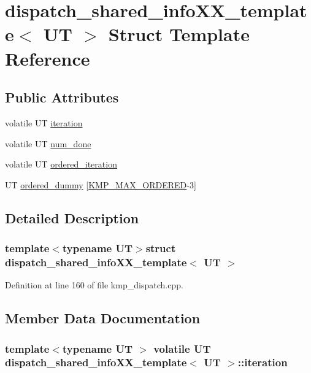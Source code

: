 \hypertarget{structdispatch__shared__infoXX__template}{\section{dispatch\-\_\-shared\-\_\-info\-X\-X\-\_\-template$<$ U\-T $>$ Struct Template Reference}
\label{structdispatch__shared__infoXX__template}
}
\subsection*{Public Attributes}
\begin{DoxyCompactItemize}
\item 
volatile U\-T \hyperlink{structdispatch__shared__infoXX__template_addd0415a887dac56b1103fa708cec5ca}{iteration}
\item 
volatile U\-T \hyperlink{structdispatch__shared__infoXX__template_ac7d0f74c4a438b516a94455a55c9949a}{num\-\_\-done}
\item 
volatile U\-T \hyperlink{structdispatch__shared__infoXX__template_a34f55d961278aab230430ecf230ab92e}{ordered\-\_\-iteration}
\item 
U\-T \hyperlink{structdispatch__shared__infoXX__template_a90650146228be5fcac95c7dabaaa7fcc}{ordered\-\_\-dummy} \mbox{[}\hyperlink{kmp_8h_ab5cc9eb736cfbc3fe74fc2324c0b19be}{K\-M\-P\-\_\-\-M\-A\-X\-\_\-\-O\-R\-D\-E\-R\-E\-D}-\/3\mbox{]}
\end{DoxyCompactItemize}


\subsection{Detailed Description}
\subsubsection*{template$<$typename U\-T$>$struct dispatch\-\_\-shared\-\_\-info\-X\-X\-\_\-template$<$ U\-T $>$}



Definition at line 160 of file kmp\-\_\-dispatch.\-cpp.



\subsection{Member Data Documentation}
\hypertarget{structdispatch__shared__infoXX__template_addd0415a887dac56b1103fa708cec5ca}{
\subsubsection[{iteration}]{\setlength{\rightskip}{0pt plus 5cm}template$<$typename U\-T $>$ volatile U\-T {\bf dispatch\-\_\-shared\-\_\-info\-X\-X\-\_\-template}$<$ U\-T $>$\-::iteration}}\label{structdispatch__shared__infoXX__template_addd0415a887dac56b1103fa708cec5ca}


